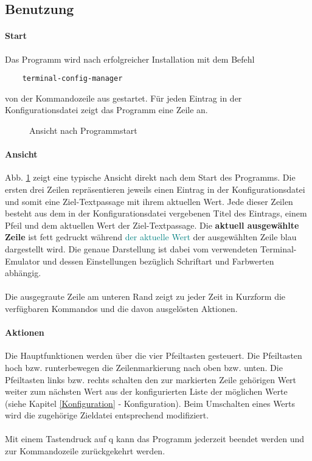 \subsection{Benutzung} \label{Benutzung}
\paragraph{Start}
Das Programm wird nach erfolgreicher Installation mit dem Befehl

\begin{verbatim}
    terminal-config-manager
\end{verbatim}

von der Kommandozeile aus gestartet. Für jeden Eintrag in der Konfigurationsdatei
zeigt das Programm eine Zeile an.

\begin{figure}
    \caption{Ansicht nach Programmstart}
    \label{post-start}
    \begin{center}
    \end{center}
\end{figure}

\paragraph{Ansicht}
Abb. \ref{post-start} zeigt eine typische Ansicht direkt nach dem Start des
Programms. Die ersten drei Zeilen repräsentieren jeweils einen Eintrag in
der Konfigurationsdatei und somit eine Ziel-\gls{Textpassage} mit ihrem
aktuellen Wert. Jede dieser Zeilen besteht aus dem in der Konfigurationsdatei
vergebenen Titel des Eintrags, einem Pfeil und dem aktuellen Wert der Ziel-\gls{Textpassage}.
Die \textbf{aktuell ausgewählte Zeile} ist fett gedruckt während
\textcolor{teal}{der aktuelle Wert} der ausgewählten Zeile blau dargestellt wird.
Die genaue Darstellung ist dabei vom verwendeten Terminal-Emulator und dessen
Einstellungen bezüglich Schriftart und Farbwerten abhängig.

\paragraph{}
Die ausgegraute Zeile am unteren Rand zeigt zu jeder Zeit in Kurzform die verfügbaren
Kommandos und die davon ausgelösten Aktionen.

\paragraph{Aktionen}
Die Hauptfunktionen werden über die vier Pfeiltasten gesteuert. Die Pfeiltasten
hoch bzw. runterbewegen die Zeilenmarkierung nach oben bzw. unten. Die Pfeiltasten
links bzw. rechts schalten den zur markierten Zeile gehörigen Wert weiter zum
nächsten Wert aus der konfigurierten Liste der möglichen Werte
(siehe Kapitel \ref{Konfiguration} - Konfiguration). Beim Umschalten eines Werts
wird die zugehörige Zieldatei entsprechend modifiziert.

\paragraph{} Mit einem Tastendruck auf q kann das Programm jederzeit beendet werden
und zur Kommandozeile zurückgekehrt werden.